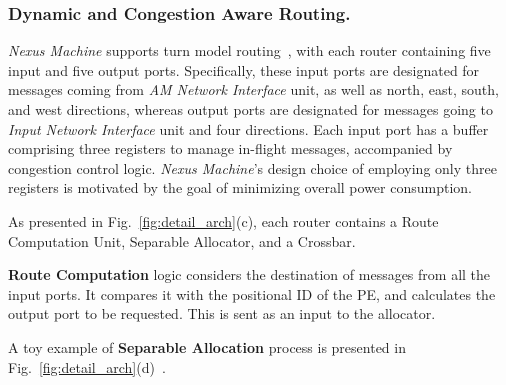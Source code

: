 \subsubsection{Dynamic and Congestion Aware Routing.}
\textit{Nexus Machine} supports turn model routing~\cite{noc_peh}, with each router containing five input and five output ports.
Specifically, these input ports are designated for messages coming from \textit{AM Network Interface} unit, as well as north, east, south, and west directions, whereas output ports are designated for messages going to \textit{Input Network Interface} unit and four directions.
Each input port has a buffer comprising three registers to manage in-flight messages, accompanied by congestion control logic. \textit{Nexus Machine}'s design choice of employing only three registers is motivated by the goal of minimizing overall power consumption.

As presented in Fig.~\ref{fig:detail_arch}(c), each router contains a Route Computation Unit, Separable Allocator, and a Crossbar.

\textbf{Route Computation} logic considers the destination of messages from all the input ports. It compares it with the positional ID of the PE, and calculates the output port to be requested. This is sent as an input to the allocator.

A toy example of \textbf{Separable Allocation} process is presented in Fig.~\ref{fig:detail_arch}(d)~\cite{noc_peh}.
\iffalse
The request matrix's rows correspond to input ports, and columns correspond to output ports.
The process consists of two stages of 6:1 and 5:1 fixed priority arbiters. The first stage prunes the matrix to ensure that each output port (or resource) receives requests from at most one input port (or requestor). Subsequently, the backpressure signal is applied to each output port, enabling congestion control, as explained below. The second stage further prunes the matrix to guarantee one grant per input port.
The allocator executes within a single cycle, marking granted requests as issued immediately to prevent them from bidding again.
\fi

